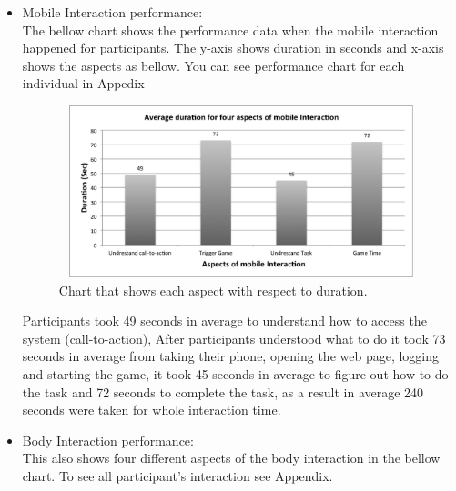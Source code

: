 \begin{itemize}

\item Mobile Interaction performance: \\
The bellow chart shows the performance data when the mobile interaction happened for participants. The y-axis shows duration in seconds and x-axis shows the aspects as bellow. You can see performance chart for each individual in Appedix 

\begin{figure}[H]
\centering
\includegraphics[width=12cm,height=5cm]{Figures/6/mobile_average}%
 \caption{Chart that shows each aspect with respect to duration. }%
 \label{fig:mobile_average}%
\end{figure}

 Participants took 49 seconds in average to understand how to access the system (call-to-action), After participants understood what to do it took 73 seconds in average from taking their phone, opening the web page, logging and starting the game, it took 45 seconds in average to figure out how to do the task and 72 seconds to complete the task, as a result in average 240 seconds were taken for whole interaction time.

%


\item Body Interaction performance: \\
This also shows four different aspects of the body interaction in the bellow chart. To see all participant's interaction see Appendix. 


\end{itemize}
